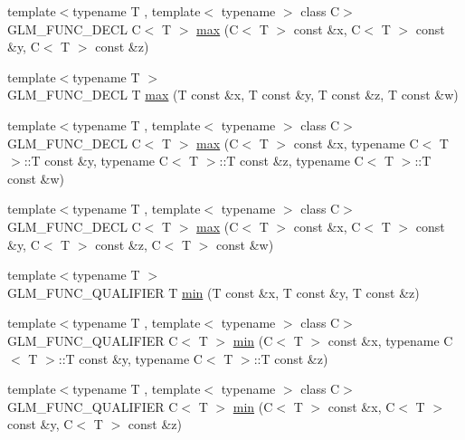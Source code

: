 \begin{DoxyCompactItemize}
\item 
{\footnotesize template$<$typename T , template$<$ typename $>$ class C$>$ }\\G\+L\+M\+\_\+\+F\+U\+N\+C\+\_\+\+D\+E\+C\+L C$<$ T $>$ \hyperlink{group__gtx__extented__min__max_gaf832e9d4ab4826b2dda2fda25935a3a4}{max} (C$<$ T $>$ const \&x, C$<$ T $>$ const \&y, C$<$ T $>$ const \&z)
\item 
{\footnotesize template$<$typename T $>$ }\\G\+L\+M\+\_\+\+F\+U\+N\+C\+\_\+\+D\+E\+C\+L T \hyperlink{group__gtx__extented__min__max_ga78e04a0cef1c4863fcae1a2130500d87}{max} (T const \&x, T const \&y, T const \&z, T const \&w)
\item 
{\footnotesize template$<$typename T , template$<$ typename $>$ class C$>$ }\\G\+L\+M\+\_\+\+F\+U\+N\+C\+\_\+\+D\+E\+C\+L C$<$ T $>$ \hyperlink{group__gtx__extented__min__max_ga7cca8b53cfda402040494cdf40fbdf4a}{max} (C$<$ T $>$ const \&x, typename C$<$ T $>$\+::T const \&y, typename C$<$ T $>$\+::T const \&z, typename C$<$ T $>$\+::T const \&w)
\item 
{\footnotesize template$<$typename T , template$<$ typename $>$ class C$>$ }\\G\+L\+M\+\_\+\+F\+U\+N\+C\+\_\+\+D\+E\+C\+L C$<$ T $>$ \hyperlink{group__gtx__extented__min__max_gaacffbc466c2d08c140b181e7fd8a4858}{max} (C$<$ T $>$ const \&x, C$<$ T $>$ const \&y, C$<$ T $>$ const \&z, C$<$ T $>$ const \&w)
\item 
{\footnotesize template$<$typename T $>$ }\\G\+L\+M\+\_\+\+F\+U\+N\+C\+\_\+\+Q\+U\+A\+L\+I\+F\+I\+E\+R T \hyperlink{group__gtx__extented__min__max_ga713d3f9b3e76312c0d314e0c8611a6a6}{min} (T const \&x, T const \&y, T const \&z)
\item 
{\footnotesize template$<$typename T , template$<$ typename $>$ class C$>$ }\\G\+L\+M\+\_\+\+F\+U\+N\+C\+\_\+\+Q\+U\+A\+L\+I\+F\+I\+E\+R C$<$ T $>$ \hyperlink{group__gtx__extented__min__max_ga74d1a96e7cdbac40f6d35142d3bcbbd4}{min} (C$<$ T $>$ const \&x, typename C$<$ T $>$\+::T const \&y, typename C$<$ T $>$\+::T const \&z)
\item 
{\footnotesize template$<$typename T , template$<$ typename $>$ class C$>$ }\\G\+L\+M\+\_\+\+F\+U\+N\+C\+\_\+\+Q\+U\+A\+L\+I\+F\+I\+E\+R C$<$ T $>$ \hyperlink{group__gtx__extented__min__max_ga42b5c3fc027fd3d9a50d2ccc9126d9f0}{min} (C$<$ T $>$ const \&x, C$<$ T $>$ const \&y, C$<$ T $>$ const \&z)

\end{DoxyCompactItemize}
